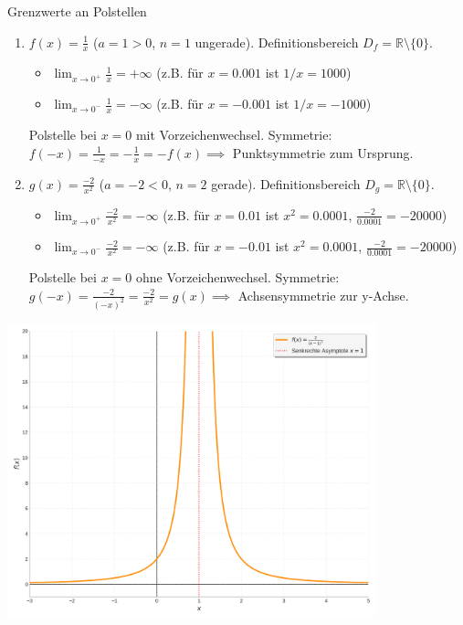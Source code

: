 \begin{beispielumgebung}{Grenzwerte an Polstellen}
\begin{enumerate}
    \item $f(x) = \frac{1}{x}$ ($a=1 > 0$, $n=1$ ungerade). Definitionsbereich $D_f = \mathbb{R} \setminus \{0\}$.
        \begin{itemize}
            \item $\lim_{x \to 0^+} \frac{1}{x} = +\infty$ (z.B. für $x=0.001$ ist $1/x = 1000$)
            \item $\lim_{x \to 0^-} \frac{1}{x} = -\infty$ (z.B. für $x=-0.001$ ist $1/x = -1000$)
        \end{itemize}
        Polstelle bei $x=0$ mit Vorzeichenwechsel.
        Symmetrie: $f(-x) = \frac{1}{-x} = -\frac{1}{x} = -f(x) \implies$ Punktsymmetrie zum Ursprung.

    \item $g(x) = \frac{-2}{x^2}$ ($a=-2 < 0$, $n=2$ gerade). Definitionsbereich $D_g = \mathbb{R} \setminus \{0\}$.
        \begin{itemize}
            \item $\lim_{x \to 0^+} \frac{-2}{x^2} = -\infty$ (z.B. für $x=0.01$ ist $x^2=0.0001$, $\frac{-2}{0.0001} = -20000$)
            \item $\lim_{x \to 0^-} \frac{-2}{x^2} = -\infty$ (z.B. für $x=-0.01$ ist $x^2=0.0001$, $\frac{-2}{0.0001} = -20000$)
        \end{itemize}
        Polstelle bei $x=0$ ohne Vorzeichenwechsel.
        Symmetrie: $g(-x) = \frac{-2}{(-x)^2} = \frac{-2}{x^2} = g(x) \implies$ Achsensymmetrie zur y-Achse.
\end{enumerate}
\begin{center}
    \includegraphics[width=0.8\textwidth]{grafiken/Gebrochen_Rational_Verschoben.png}
    \label{fig:gebr_rat_verschoben}
\end{center}
\end{beispielumgebung}


